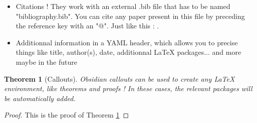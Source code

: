 \documentclass{article}
\newtheorem{theorem}{Theorem}
\begin{document}
\begin{maincontent}
\begin{itemize}
\item 
Citations ! They work with an external .bib file that has to be named "bibliography.bib". You can cite any paper present in this file by preceding the reference key with an "@". Just like this : \cite{Einstein}.

\item 
Additionnal information in a YAML header, which allows you to precise things like title, author(s), date, additionnal LaTeX packages... and more maybe in the future

\end{itemize}
\begin{theorem}[Callouts]

Obsidian callouts can be used to create any LaTeX environment, like theorems and proofs ! In these cases, the relevant packages will be automatically added.
\label{main-theorem}
\end{theorem}
\begin{proof}

This is the proof of Theorem \ref{main-theorem}
\end{proof}

\end{maincontent}
\printbibliography
\end{document}
